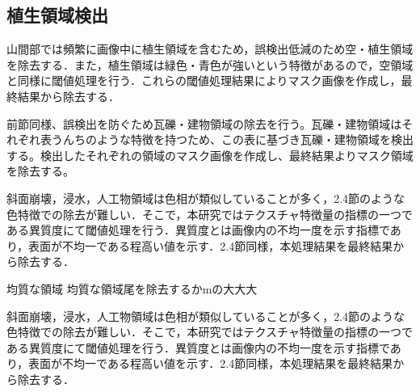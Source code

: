 \documentclass[../Thesis]{subfiles}
\begin{document}
\subsection{植生領域検出}
  山間部では頻繁に画像中に植生領域を含むため，誤検出低減のため空・植生領域を除去する．また，植生領域は緑色・青色が強いという特徴があるので，空領域と同様に閾値処理を行う．これらの閾値処理結果によりマスク画像を作成し，最終結果から除去する．
  
  前節同様、誤検出を防ぐため瓦礫・建物領域の除去を行う。瓦礫・建物領域はそれぞれ表うんちのような特徴を持つため、この表に基づき瓦礫・建物領域を検出する。検出したそれぞれの領域のマスク画像を作成し、最終結果よりマスク領域を除去する。

  斜面崩壊，浸水，人工物領域は色相が類似していることが多く，2.4節のような色特徴での除去が難しい．そこで，本研究ではテクスチャ特徴量の指標の一つである異質度にて閾値処理を行う．異質度とは画像内の不均一度を示す指標であり，表面が不均一である程高い値を示す．2.4節同様，本処理結果を最終結果から除去する．
  

  均質な領域
  均質な領域尾を除去するかmの大大大

  斜面崩壊，浸水，人工物領域は色相が類似していることが多く，2.4節のような色特徴での除去が難しい．そこで，本研究ではテクスチャ特徴量の指標の一つである異質度にて閾値処理を行う．異質度とは画像内の不均一度を示す指標であり，表面が不均一である程高い値を示す．2.4節同様，本処理結果を最終結果から除去する．
\end{document}
